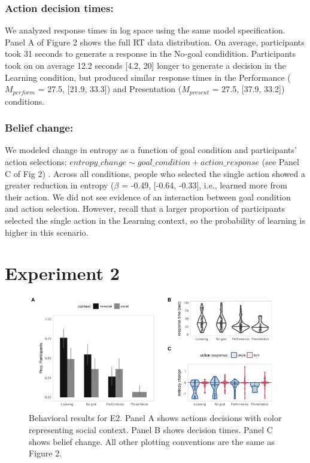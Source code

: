 \documentclass[10pt, letterpaper]{article}
\newenvironment{CodeChunk}{}{}
\begin{document}
\subsubsection{Action decision times:}\label{action-decision-times}

We analyzed response times in log space using the same model
specification. Panel A of Figure 2 shows the full RT data distribution.
On average, participants took 31 seconds to generate a response in the
No-goal condidition. Participants took on on average 12.2 seconds
{[}4.2, 20{]} longer to generate a decision in the Learning condition,
but produced similar response times in the Performance (\(M_{perform}\)
= 27.5, {[}21.9, 33.3{]}) and Presentation (\(M_{present}\) = 27.5,
{[}37.9, 33.2{]}) conditions.

\subsubsection{Belief change:}\label{belief-change}

We modeled change in entropy as a function of goal condition and
participants' action selections:
\texttt{$entropy\_change \sim goal\_condition + action\_response$} (see
Panel C of Fig 2) . Across all conditions, people who selected the
single action showed a greater reduction in entropy (\(\beta\) = -0.49,
{[}-0.64, -0.33{]}, i.e., learned more from their action. We did not see
evidence of an interaction between goal condition and action selection.
However, recall that a larger proportion of participants selected the
single action in the Learning context, so the probability of learning is
higher in this scenario.

\section{Experiment 2}\label{experiment-2}

\begin{CodeChunk}
\begin{figure}[tb]

{\centering \includegraphics[width=0.95\linewidth]{figs/e2_behav_results-1} 

}

\caption[Behavioral results for E2]{Behavioral results for E2. Panel A shows actions decisions with color representing social context. Panel B shows decision times. Panel C shows belief change. All other plotting conventions are the same as Figure 2.}\label{fig:e2_behav_results}
\end{figure}
\end{CodeChunk}
\end{document}
